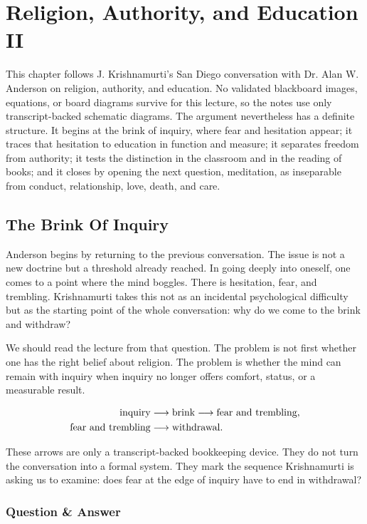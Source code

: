 \chapter{Religion, Authority, and Education II}

This chapter follows J. Krishnamurti's San Diego conversation with Dr. Alan W. Anderson on religion, authority, and education. No validated blackboard images, equations, or board diagrams survive for this lecture, so the notes use only transcript-backed schematic diagrams. The argument nevertheless has a definite structure. It begins at the brink of inquiry, where fear and hesitation appear; it traces that hesitation to education in function and measure; it separates freedom from authority; it tests the distinction in the classroom and in the reading of books; and it closes by opening the next question, meditation, as inseparable from conduct, relationship, love, death, and care.

\section{The Brink Of Inquiry}

Anderson begins by returning to the previous conversation. The issue is not a new doctrine but a threshold already reached. In going deeply into oneself, one comes to a point where the mind boggles. There is hesitation, fear, and trembling. Krishnamurti takes this not as an incidental psychological difficulty but as the starting point of the whole conversation: why do we come to the brink and withdraw?

We should read the lecture from that question. The problem is not first whether one has the right belief about religion. The problem is whether the mind can remain with inquiry when inquiry no longer offers comfort, status, or a measurable result.

\begin{align}
\hbox{inquiry}
&\longrightarrow \hbox{brink}
\longrightarrow \hbox{fear and trembling},\\
\hbox{fear and trembling}
&\longrightarrow \hbox{withdrawal}.
\end{align}

These arrows are only a transcript-backed bookkeeping device. They do not turn the conversation into a formal system. They mark the sequence Krishnamurti is asking us to examine: does fear at the edge of inquiry have to end in withdrawal?

\subsection{Question \& Answer}


